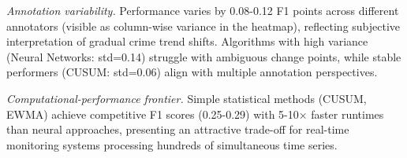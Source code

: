 \textit{Annotation variability.} Performance varies by 0.08-0.12 F1 points across different annotators (visible as column-wise variance in the heatmap), reflecting subjective interpretation of gradual crime trend shifts. Algorithms with high variance (Neural Networks: std=0.14) struggle with ambiguous change points, while stable performers (CUSUM: std=0.06) align with multiple annotation perspectives.

\textit{Computational-performance frontier.} Simple statistical methods (CUSUM, EWMA) achieve competitive F1 scores (0.25-0.29) with 5-10× faster runtimes than neural approaches, presenting an attractive trade-off for real-time monitoring systems processing hundreds of simultaneous time series.

